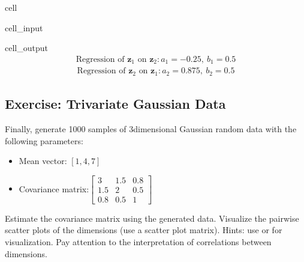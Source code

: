 \documentclass[letterpaper,10pt,english]{jupyterBook}
\begin{document}
\begin{sphinxuseclass}{cell}
\begin{sphinxVerbatimInput}
\begin{sphinxuseclass}{cell_input}
\end{sphinxuseclass}\end{sphinxVerbatimInput}
\begin{sphinxVerbatimOutput}

\begin{sphinxuseclass}{cell_output}\begin{equation*}
\begin{split}\displaystyle \text{Regression of }\mathbf z_1\text{ on }\mathbf z_2: a_1 =-0.25,\ b_1 =0.5\end{split}
\end{equation*}\begin{equation*}
\begin{split}\displaystyle \text{Regression of }\mathbf z_2\text{ on }\mathbf z_1: a_2 =0.875,\ b_2 =0.5\end{split}
\end{equation*}
\noindent{}

\end{sphinxuseclass}\end{sphinxVerbatimOutput}

\end{sphinxuseclass}

\subsection{Exercise: Trivariate Gaussian Data}
\label{\detokenize{01:exercise-trivariate-gaussian-data}}
\sphinxAtStartPar
Finally, generate 1000 samples of 3\sphinxhyphen{}dimensional Gaussian random data with the following parameters:
\begin{itemize}
\item {} 
\sphinxAtStartPar
Mean vector: \([1, 4, 7]\)

\item {} 
\sphinxAtStartPar
Covariance matrix:\(\begin{bmatrix}3&1.5&0.8\\1.5&2&0.5\\0.8&0.5&1\end{bmatrix}\)

\end{itemize}

\sphinxAtStartPar
Estimate the covariance matrix using the generated data. Visualize the pairwise scatter plots of the dimensions (use a scatter plot matrix).
Hints: use  or  for visualization.
Pay attention to the interpretation of correlations between dimensions.
\end{document}
